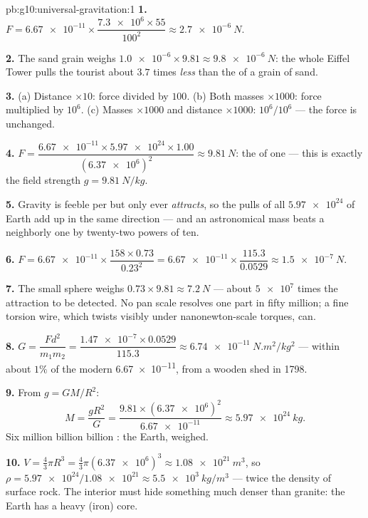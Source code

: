 \begin{solution}{pb:g10:universal-gravitation:1}
\textbf{1.} $F = \num{6.67e-11} \times
\dfrac{\num{7.3e6} \times 55}{100^2} \approx \qty{2.7e-6}{N}$.

\textbf{2.} The sand grain weighs
$\num{1.0e-6} \times 9.81 \approx \qty{9.8e-6}{N}$: the whole Eiffel
Tower pulls the tourist about $3.7$ times \emph{less} than the 
of a grain of sand.

\textbf{3.} (a) Distance $\times 10$: force divided by $100$.
(b) Both masses $\times 1000$: force multiplied by $10^6$.
(c) Masses $\times 1000$ and distance $\times 1000$:
$10^6 / 10^6$ --- the force is unchanged.

\textbf{4.} $F = \dfrac{\num{6.67e-11} \times \num{5.97e24} \times
1.00}{(\num{6.37e6})^2} \approx \qty{9.81}{N}$: the  of one
 --- this is exactly the field strength
$g = \qty{9.81}{N/kg}$.

\textbf{5.} Gravity is feeble per  but only ever
\emph{attracts}, so the pulls of all $\num{5.97e24}$  of
Earth add up in the same direction --- and an astronomical mass beats
a neighborly one by twenty-two powers of ten.

\textbf{6.} $F = \num{6.67e-11} \times \dfrac{158 \times 0.73}{0.23^2}
= \num{6.67e-11} \times \dfrac{115.3}{0.0529}
\approx \qty{1.5e-7}{N}$.

\textbf{7.} The small sphere weighs
$0.73 \times 9.81 \approx \qty{7.2}{N}$ --- about $\num{5e7}$ times
the attraction to be detected. No pan scale resolves one part in
fifty million; a fine torsion wire, which twists visibly under
nanonewton-scale torques, can.

\textbf{8.} $G = \dfrac{F d^2}{m_1 m_2}
= \dfrac{\num{1.47e-7} \times 0.0529}{115.3}
\approx \qty{6.74e-11}{N.m^2/kg^2}$ --- within about $1\%$ of the
modern \num{6.67e-11}, from a wooden shed in 1798.

\textbf{9.} From $g = G M / R^2$:
\[
M = \frac{g R^2}{G}
= \frac{9.81 \times (\num{6.37e6})^2}{\num{6.67e-11}}
\approx \qty{5.97e24}{kg}.
\]
Six million billion billion : the Earth, weighed.

\textbf{10.} $V = \frac43 \pi R^3 = \frac43 \pi
(\num{6.37e6})^3 \approx \qty{1.08e21}{m^3}$, so
$\rho = \num{5.97e24}/\num{1.08e21} \approx \qty{5.5e3}{kg/m^3}$ ---
twice the density of surface rock. The interior must hide something
much denser than granite: the Earth has a heavy (iron) core.


\end{solution}
